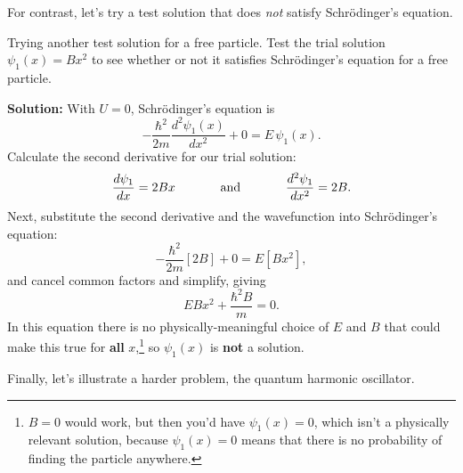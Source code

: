 For contrast, let's try a test solution that does {\it not} satisfy
Schr\"odinger's equation.

\begin{example}{Trying another test solution for a free particle.}
Test the trial solution $\psi_1(x) = Bx^2$ to see whether or not 
it satisfies Schr\"odinger's equation for a free particle.

{\bf Solution:} With $U=0$, Schr\"odinger's equation is
\begin{equation}
-\frac{\hbar^2}{2m}\frac{d^2\psi_1(x)}{dx^2} + 0 = E\,\psi_1(x) . \nonumber
\end{equation}
Calculate the second derivative for our trial solution:
\begin{equation}
\frac{d\psi_1}{dx} = 2Bx \hspace{0.5in}  
  \mbox{and} \hspace{0.5in} \frac{d^2\psi_1}{dx^2} = 2B. 
\end{equation}
Next, substitute the second derivative and the wavefunction
into Schr\"odinger's equation:
\begin{equation}
-\frac{\hbar^2}{2m}\left[2B\right] + 0 = E\left[Bx^2\right], 
\end{equation}
and cancel common factors and simplify, giving
\begin{equation}
E B x^2 + \frac{\hbar^2 B}{m} = 0.
\end{equation}
In this equation there is no physically-meaningful choice 
of $E$ and $B$ that could make this true for \textbf{all} $x$,\footnote{$B=0$ 
would work, but then you'd have $\psi_1(x) = 0$, which isn't a 
physically relevant solution, because $\psi_1(x) = 0$ means that 
there is no probability of finding the particle anywhere.} so 
$\psi_1(x)$ is \textbf{not} a solution.
\end{example}
\newpage

Finally, let's illustrate a harder problem, the quantum harmonic
oscillator.  


